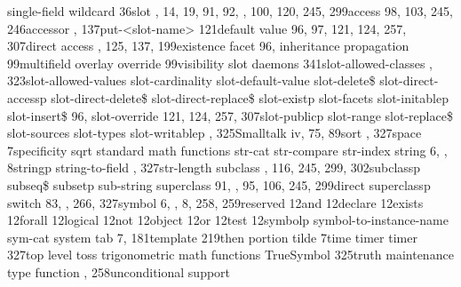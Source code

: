 \documentclass[letterpaper,10pt,english]{sphinxmanual}
\begin{document}
single-field wildcard 36slot , 14, 19, 91, 92, , 100,
120, 245, 299access 98, 103, 245, 246accessor ,
137put-\textless{}slot-name\textgreater{} 121default value 96, 97, 121, 124, 257, 307direct
access , 125, 137, 199existence facet 96,
inheritance propagation 99multifield overlay
override 99visibility slot daemons
341slot-allowed-classes , 323slot-allowed-values
slot-cardinality slot-default-value
slot-delete\$ slot-direct-accessp
slot-direct-delete\$ slot-direct-replace\$
slot-existp slot-facets slot-initablep
slot-insert\$ 96, slot-override 121, 124, 257,
307slot-publicp slot-range slot-replace\$
slot-sources slot-types slot-writablep
, 325Smalltalk iv, 75, 89sort , 327space 7specificity
sqrt standard math functions str-cat
str-compare str-index string 6, ,
8stringp string-to-field , 327str-length
subclass , 116, 245, 299, 302subclassp subseq\$
subsetp sub-string superclass 91, , 95,
106, 245, 299direct superclassp switch 83, ,
266, 327symbol 6, , 8, 258, 259reserved 12and 12declare 12exists
12forall 12logical 12not 12object 12or 12test 12symbolp
symbol-to-instance-name sym-cat system
tab 7, 181template 219then portion tilde 7time
timer timer 327top level toss
trigonometric math functions TrueSymbol 325truth
maintenance type function , 258unconditional support
\end{document}
